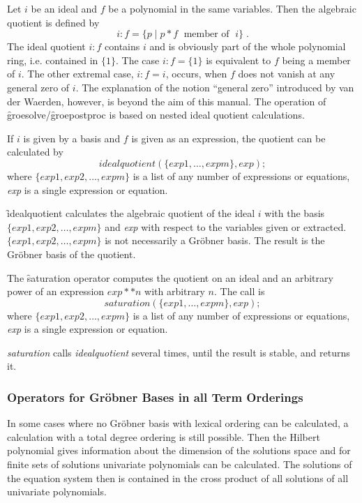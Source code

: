  
\hypertarget{operator:IDEALQUOTIENT}{}
Let $i$ be an ideal and $f$ be a polynomial in the same
variables. Then the algebraic quotient is defined by
\[
i:f = \{ p \;| \; p * f \;\mbox{    member of }\; i\}\;.
\]
The ideal quotient $i:f$ contains $i$ and is obviously part of the
whole polynomial ring, i.e. contained in $\{1\}$. The case $i:f =
\{1\}$ is equivalent to $f$ being a member of  $i$. The other extremal
case, $i:f=i$, occurs, when $f$ does not vanish at any general zero of $i$.
The explanation of the notion ``general zero'' introduced by van der
Waerden, however, is beyond the aim of this manual. The operation
of \f{groesolve}/\f{groepostproc} is based on nested ideal quotient
calculations.

If $i$ is given by a basis and $f$ is given as an expression, the
quotient can be calculated by
\[
idealquotient (\{exp1, \ldots , expm\}, exp); \]
where $\{exp1, exp2, \ldots , expm\}$ is a list of any number of
expressions or equations, {\it exp} is a single expression or equation.

\f{idealquotient} calculates the algebraic quotient of the ideal $i$
with the basis  $\{exp1, exp2, \ldots , expm\}$ and {\it exp} with
respect to  the variables given or extracted.  $\{exp1, exp2, \ldots ,
expm\}$ is not necessarily a Gr\"obner basis.
The result is the Gr\"obner basis of the quotient.

\hypertarget{operator:SATURATION}{}
The \f{saturation} operator computes the quotient on an ideal and an arbitrary power
of an expression $exp**n$ with arbitrary $n$. The call is
\[ saturation (\{exp1, \ldots , expm\}, exp); \]
where $\{exp1, exp2, \ldots , expm\}$ is a list of any number of
expressions or equations, {\it exp} is a single expression or equation.

\emph{saturation} calls \emph{idealquotient} several times, until the result is
stable, and returns it.

\subsubsection{Operators for Gr\"obner Bases in all Term Orderings}
In some cases where no Gr\"obner
basis with lexical ordering can be calculated, a calculation with a total
degree ordering is still possible. Then the Hilbert polynomial gives
information about the dimension of the solutions space and for finite
sets of solutions univariate polynomials can be calculated. The solutions
of the equation system then is contained in the cross product of all
solutions of all univariate polynomials.

